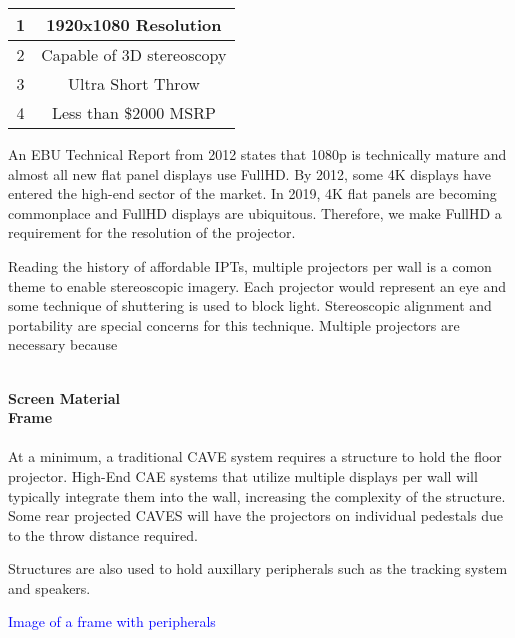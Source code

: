 \begin{center}
	\begin{tabular}{|c|c|}
		\hline 
		1 & 1920x1080 Resolution \\ 
		\hline 
		2 & Capable of 3D stereoscopy \\ 
		\hline 
		3 & Ultra Short Throw \\ 
		\hline 
		4 & Less than \$2000 MSRP \\ 
		\hline 
	\end{tabular} 
\end{center}

An EBU Technical Report from 2012 states that 1080p is technically mature and almost all new flat panel displays use FullHD. By 2012, some 4K displays have entered the high-end sector of the market. \cite{ebuHDTVRef} In 2019, 4K flat panels are becoming commonplace and FullHD displays are ubiquitous. Therefore, we make FullHD a requirement for the resolution of the projector.

Reading the history of affordable IPTs, multiple projectors per wall is a comon theme to enable stereoscopic imagery. Each projector would represent an eye and some technique of shuttering is used to block light. Stereoscopic alignment and portability are special concerns for this technique. Multiple projectors are necessary because 

\label{sec:hwScreensSection}\\

\filbreak
\noindent\textbf{Screen Material} \\

\filbreak
\noindent\textbf{Frame} \\

\label{sec:hwScreensSection}\\

At a minimum, a traditional CAVE system requires a structure to hold the floor projector. High-End CAE systems that utilize multiple displays per wall will typically integrate them into the wall, increasing the complexity of the structure. Some rear projected CAVES will have the projectors on individual pedestals due to the throw distance required.

Structures are also used to hold auxillary peripherals such as the tracking system and speakers.

\begin{center}
	\textcolor{blue}{Image of a frame with peripherals}
\end{center}


